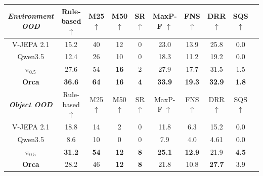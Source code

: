 \documentclass{llmxive}
\begin{document}
\begin{table}[t]
  \centering
  \small
  \setlength{\tabcolsep}{2.7mm}
  \begin{threeparttable}
    \begin{tabular}{c|c|cccccccc}
    \toprule[1pt]
    \textbf{\textit{Environment OOD}}& Rule-based $\uparrow$ & M25 $\uparrow$\tnote{1} & M50 $\uparrow$\tnote{1} & SR $\uparrow$\tnote{2} & MaxP-F $\uparrow$\tnote{3} &  FNS $\uparrow$\tnote{4} & DRR $\uparrow$\tnote{5}  & SQS $\uparrow$\tnote{6} \\
    \midrule[0.5pt]
    V-JEPA 2.1 &15.2  & 40    & 12    & 0     & 23.0   & 13.9   & 25.8  &  0.0\\
    Qwen3.5 & 12.4  & 26    & 10    & 0     & 18.3   & 11.2   & 19.2  &  0.0\\
    $\pi_{0.5}$ & 27.6  & 54    & \textbf{16} & 2     & 27.9  & 17.7   & 31.5  &  1.5\\
    \rowcolor[rgb]{ .89,  .949,  .851}\textbf{Orca} &\textbf{36.6} & \textbf{64} & \textbf{16} & \textbf{4} & \textbf{33.9}   & \textbf{19.3}  & \textbf{32.9} & \textbf{1.8} \\
    \midrule[1pt]
    
    \multicolumn{1}{c}{\textbf{\textit{Object OOD}}} & Rule-based $\uparrow$   & M25 $\uparrow$ & M50 $\uparrow$ & SR $\uparrow$ & MaxP-F $\uparrow$ & FNS $\uparrow$  & DRR $\uparrow$  & SQS $\uparrow$ \\
    \midrule[0.5pt]
    V-JEPA 2.1 &18.8  & 14    & 2     & 0     & 11.8  & 6.3    & 15.2  & 0.0 \\
    Qwen3.5 & 8.6   & 10    & 0     & 0     & 7.9   & 4.0     & 4.61  & 0.0\\
    $\pi_{0.5}$& \textbf{31.2} & \textbf{54}    & \textbf{12} & \textbf{8} & \textbf{25.1}  & \textbf{12.9}   & 21.9  & \textbf{4.5} \\
    \rowcolor[rgb]{ .89,  .949,  .851}\textbf{Orca} & 28.2  & 46 & \textbf{12}    & \textbf{8} & 21.8  &  10.8 & \textbf{27.7} & 3.9 \\
    \midrule[1pt]
    

\end{tabular}
\end{threeparttable}
\end{table}
\end{document}

